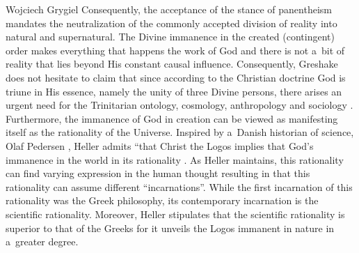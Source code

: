 \begin{artengenv}{Wojciech Grygiel}
{}
Consequently, the acceptance of the stance of panentheism mandates the neutralization of the commonly accepted division of reality into natural and supernatural. The Divine immanence in the created (contingent) order makes everything that happens the work of God and there is not a~bit of reality that lies beyond His constant causal influence. Consequently, Greshake does not hesitate to claim that since according to the Christian doctrine God is triune in His essence, namely the unity of three Divine persons, there arises an urgent need for the Trinitarian ontology, cosmology, anthropology and sociology
\parencite[][p.42]{greshake_dreieine_1997}. %
 Furthermore, the immanence of God in creation can be viewed as manifesting itself as the rationality of the Universe. Inspired by a~Danish historian of science, Olaf Pedersen 
\parencite*[][pp.63–65]{pedersen_two_2007}, %
 Heller admits ``that Christ the Logos implies that God’s immanence in the world in its rationality 
\parencite[][p.57]{heller_scientific_2003}. %
 As Heller maintains, this rationality can find varying expression in the human thought resulting in that this rationality can assume different ``incarnations''. While the first incarnation of this rationality was the Greek philosophy, its contemporary incarnation is the scientific rationality. Moreover, Heller 
\parencite*[][]{heller_teologia_2016} %
 stipulates that the scientific rationality is superior to that of the Greeks for it unveils the Logos immanent in nature in a~greater degree.


\end{artengenv}
